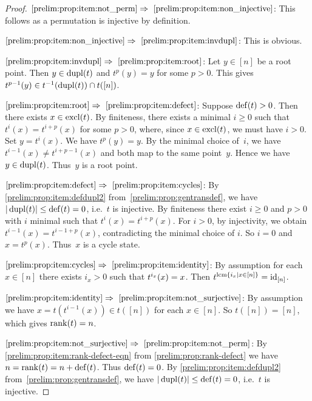 \begin{proof} 
	$\ref{prelim:prop:item:not_perm}\Rightarrow~\ref{prelim:prop:item:non_injective}$: This follows as a permutation 
	is injective by definition.
		
	$\ref{prelim:prop:item:non_injective}\Rightarrow~\ref{prelim:prop:item:invdupl}$: 
	This is obvious.
	
	$\ref{prelim:prop:item:invdupl}\Rightarrow~\ref{prelim:prop:item:root}$:
	Let $y \in [n]$ be a root point.
	Then $y \in \dupl{t}$ and $t^p(y) = y$ for some $p > 0$.
	This gives $t^{p-1}(y) \in t^{-1}(\dupl{t}) \cap t([n])$.	
		
	$\ref{prelim:prop:item:root}\Rightarrow~\ref{prelim:prop:item:defect}$:
	Suppose $\defect{t} > 0$.
	Then there exists $x \in \excl{t}$.
	By finiteness, there exists a minimal $i \ge 0$
	such that $t^i(x) = t^{i+p}(x)$ for some $p > 0$, where, since $x \in \excl{t}$, we must have $i > 0$.
	Set $y = t^{i}(x)$. We have $t^p(y) = y$.
	By the minimal choice of~$i$, we have $t^{i-1}(x) \ne t^{i + p - 1}(x)$
	and both map to the same point~$y$. Hence we have $y \in \dupl{t}$.
	Thus~$y$ is a root point.
		
	$\ref{prelim:prop:item:defect}\Rightarrow~\ref{prelim:prop:item:cycles}$:
	By \cref{prelim:prop:item:defdupl2} from~\cref{prelim:prop:gentransdef},
	we have $|\dupl{t}| \le \defect{t} = 0$, i.e.~$t$ is injective.
	By finiteness
	there exist $i \ge 0$ and $p > 0$ with $i$ minimal
	such that $t^i(x) = t^{i+p}(x)$.
	For $i > 0$, by injectivity, we obtain $t^{i-1}(x) = t^{i - 1 + p}(x)$,
	contradicting the minimal choice of $i$. So $i = 0$ and $x = t^p(x)$. Thus~$x$
	is a cycle state.
		
	$\ref{prelim:prop:item:cycles}\Rightarrow~\ref{prelim:prop:item:identity}$: 
	By assumption for each $x \in [n]$ there exists $i_x > 0$
	such that $\applyfunc{x}{t^{i_x}} = x$.
	Then $t^{\lcm\{ i_x \mid x \in [n] \}} = \operatorname{id}_{[n]}$.	
	
	$\ref{prelim:prop:item:identity}\Rightarrow~\ref{prelim:prop:item:not_surjective}$: 
	By assumption we have $x = t(t^{i-1}(x)) \in t([n])$ for each $x \in [n]$.
	So $t([n]) = [n]$, which gives $\rank{t} = n$.	
	
	$\ref{prelim:prop:item:not_surjective}\Rightarrow~\ref{prelim:prop:item:not_perm}$:
	By \cref{prelim:prop:item:rank-defect-eqn} from \cref{prelim:prop:rank-defect} 
	we have $n = \rank{t} = n + \defect{t}$. Thus $\defect{t} = 0$.
	By \cref{prelim:prop:item:defdupl2} from~\cref{prelim:prop:gentransdef},
	we have $|\dupl{t}| \le \defect{t} = 0$, i.e.~$t$ is injective.	
\end{proof} 

